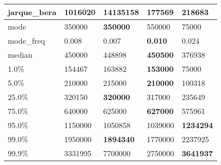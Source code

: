 \begin{table}[H]
\begin{tabular}{|l|m{10em}|m{10em}|m{10em}|m{10em}|}
\hline jarque\_bera & 1016020 & \cellcolor[rgb]{0.9, 0.54, 0.52} 14135158 & 177569 & \bfseries 218683 \\
\hline mode & 350000 & \bfseries 350000 & 550000 & \cellcolor[rgb]{0.9, 0.54, 0.52} 75000 \\
\hline mode\_freq & 0.008 & 0.007 & \bfseries 0.010 & \cellcolor[rgb]{0.9, 0.54, 0.52} 0.024 \\
\hline median & 450000 & 448898 & \bfseries 450500 & \cellcolor[rgb]{0.9, 0.54, 0.52} 376938 \\
\hline 1.0\% & 154467 & 163882 & \bfseries 153000 & \cellcolor[rgb]{0.9, 0.54, 0.52} 75000 \\
\hline 5.0\% & 210000 & 215000 & \bfseries 210000 & \cellcolor[rgb]{0.9, 0.54, 0.52} 100318 \\
\hline 25.0\% & 320150 & \bfseries 320000 & 317000 & \cellcolor[rgb]{0.9, 0.54, 0.52} 235649 \\
\hline 75.0\% & 640000 & 625000 & \bfseries 627000 & \cellcolor[rgb]{0.9, 0.54, 0.52} 575961 \\
\hline 95.0\% & 1150000 & 1050858 & \cellcolor[rgb]{0.9, 0.54, 0.52} 1039000 & \bfseries 1234294 \\
\hline 99.0\% & 1950000 & \bfseries 1894340 & 1770000 & \cellcolor[rgb]{0.9, 0.54, 0.52} 2237925 \\
\hline 99.9\% & 3331995 & \cellcolor[rgb]{0.9, 0.54, 0.52} 7700000 & 2750000 & \bfseries 3641937 \\
\hline
\end{tabular}
\end{table}
